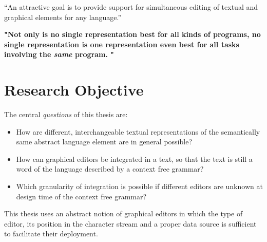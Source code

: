 
``An attractive goal is to provide support for simultaneous editing of textual and graphical elements for any language.''\cite{EMP}


\textbf{
"Not only is no single representation best for all kinds of programs, no single representation is one representation even best for all tasks involving the \emph{same}  program. " \cite{Petri} }



\section{Research Objective}
The central \emph{questions} of this thesis are:
\begin{itemize}
	\item How are different, interchangeable textual representations of the semantically same abstract language element are in general possible?
	\item How can graphical editors be integrated in a text, so that the text is still a word of the language described by a context free grammar?
	\item Which granularity of integration is possible if different editors are unknown at design time of the context free grammar?
\end{itemize}

This thesis uses an abstract notion of graphical editors in which the type of editor, its position in the character stream and a proper data source is sufficient to facilitate their deployment.




